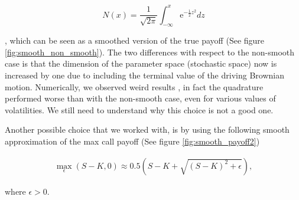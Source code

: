 \documentclass[11pt]{article}
\begin{document}
\begin{equation}
N(x)=\frac{1}{\sqrt{2\pi}} \int_{-\infty}^{x} \mathrm e^{-\frac{1}{2}z^2} dz
\label{eq:5}
\end{equation}


, which can be seen as a smoothed version of the true payoff (See figure \ref{fig:smooth_non_smooth}). The two differences with respect to the non-smooth case is that the dimension of the parameter space (stochastic space) now is increased by one  due to including the terminal value of the driving Brownian motion. Numerically, we observed weird results , in fact the quadrature performed worse than with the non-smooth case,  even for various values of volatilities. We still need to understand why this choice is not a good one. 


Another possible choice that we worked with,  is by using the following smooth approximation of the max call payoff (See figure \ref{fig:smooth_payoff2})

\begin{align}\label{eq:smooth_payoff2}
	\operatorname{\max}_\epsilon(S-K,0) \approx 0.5 ( S-K+\sqrt{ (S-K)^{2}+\epsilon}),
\end{align}

where $\epsilon>0$.
\end{document}
